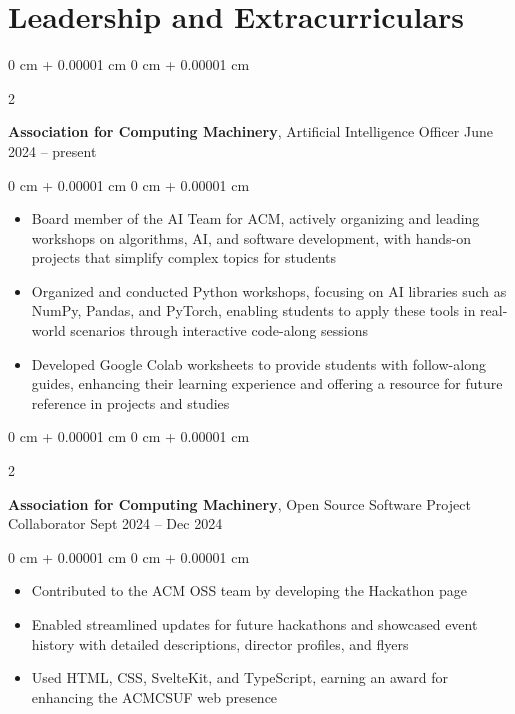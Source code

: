 \documentclass[10pt, letterpaper]{article}
\newenvironment{highlights}{
    \begin{itemize}[
        topsep=0.10 cm,
        parsep=0.10 cm,
        partopsep=0pt,
        itemsep=0pt,
        leftmargin=0 cm + 10pt
    ]
}{
    \end{itemize}
} %
\newenvironment{onecolentry}{
    \begin{adjustwidth}{
        0 cm + 0.00001 cm
    }{
        0 cm + 0.00001 cm
    }
}{
    \end{adjustwidth}
} %
\newenvironment{twocolentry}[2][]{
    \onecolentry
    \def\secondColumn{#2}
    \setcolumnwidth{\fill, 4.5 cm}
    \begin{paracol}{2}
}{
    \switchcolumn \raggedleft \secondColumn
    \end{paracol}
    \endonecolentry
} %
\begin{document}
    
    \section{Leadership and Extracurriculars}



        
        \begin{twocolentry}{
            June 2024 – present
        }
            \textbf{Association for Computing Machinery}, Artificial Intelligence  Officer\end{twocolentry}

        \vspace{0.10 cm}
        \begin{onecolentry}
            \begin{highlights}
                \item Board member of the AI Team for ACM, actively organizing and leading workshops on algorithms, AI, and software development, with hands-on projects that simplify complex topics for students
                \item Organized and conducted Python workshops, focusing on AI libraries such as NumPy, Pandas, and PyTorch, enabling students to apply these tools in real-world scenarios through interactive code-along sessions
                \item Developed Google Colab worksheets to provide students with follow-along guides, enhancing their learning experience and offering a resource for future reference in projects and studies
            \end{highlights}
        \end{onecolentry}


        \vspace{0.2 cm}

        \begin{twocolentry}{
            Sept 2024 – Dec 2024
        }
            \textbf{Association for Computing Machinery}, Open Source Software Project Collaborator\end{twocolentry}

        \vspace{0.10 cm}
        \begin{onecolentry}
            \begin{highlights}
                \item Contributed to the ACM OSS team by developing the Hackathon page
                \item Enabled streamlined updates for future hackathons and showcased event history with detailed descriptions, director profiles, and flyers
                \item Used HTML, CSS, SvelteKit, and TypeScript, earning an award for enhancing the ACMCSUF web presence
            \end{highlights}
        \end{onecolentry}
\end{document}
